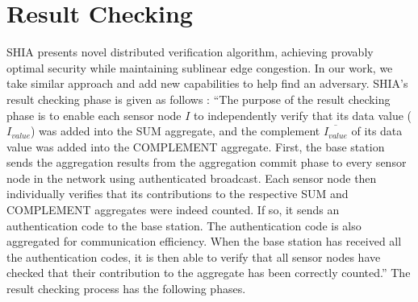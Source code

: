 \section{Result Checking} %
	\label{sec:result_checking}
	SHIA presents novel distributed verification algorithm, achieving provably optimal security while maintaining sublinear edge congestion.
	In our work, we take similar approach and add new capabilities to help find an adversary.
	SHIA's result checking phase is given as follows :
	``The purpose of the result checking phase is to enable each sensor node $I$ to independently verify that its data value ($I_{value}$) was added into the SUM aggregate, and the complement $\overline{I_{value}}$ of its data value was added into the COMPLEMENT aggregate.
		First, the base station sends the aggregation results from the aggregation commit phase to every sensor node in the network using authenticated broadcast.
		Each sensor node then individually verifies that its contributions to the respective SUM and COMPLEMENT aggregates were indeed counted.
		If so, it sends an authentication code to the base station.
		The authentication code is also aggregated for communication efficiency. 
		When the base station has received all the authentication codes, it is then able to verify that all sensor nodes have checked that their contribution to the aggregate has been correctly counted.''
	The result checking process has the following phases.
